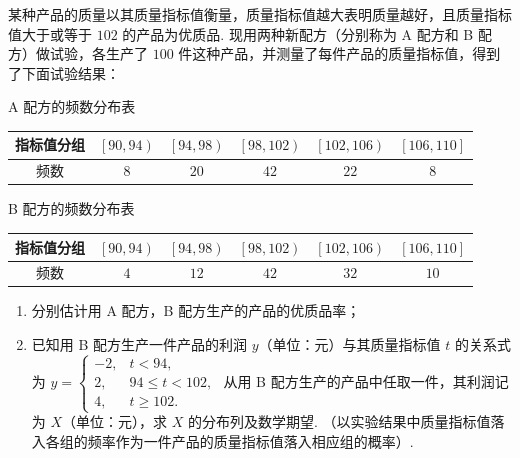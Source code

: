 \begin{problem}
某种产品的质量以其质量指标值衡量，质量指标值越大表明质量越好，且质量指标值大于或等于 \(102\) 的产品为优质品. 现用两种新配方（分别称为 A 配方和 B 配方）做试验，各生产了 \(100\) 件这种产品，并测量了每件产品的质量指标值，得到了下面试验结果：

\begin{center}
A 配方的频数分布表

\begin{tabular}{c|c|c|c|c|c}
\hline
指标值分组 & \(\left[90,94\right)\) & \(\left[94,98\right)\) & \(\left[98,102\right)\) & \(\left[102,106\right)\) & \(\left[106,110\right]\) \\
\hline
频数 & \(8\) & \(20\) & \(42\) & \(22\) & \(8\) \\
\hline
\end{tabular}

B 配方的频数分布表

\begin{tabular}{c|c|c|c|c|c}
\hline
指标值分组 & \(\left[90,94\right)\) & \(\left[94,98\right)\) & \(\left[98,102\right)\) & \(\left[102,106\right)\) & \(\left[106,110\right]\) \\
\hline
频数 & \(4\) & \(12\) & \(42\) & \(32\) & \(10\) \\
\hline
\end{tabular}
\end{center}

\begin{enumerate}
\item 分别估计用 A 配方，B 配方生产的产品的优质品率；
\item 已知用 B 配方生产一件产品的利润 \(y\)（单位：元）与其质量指标值 \(t\) 的关系式为 \( y = \begin{cases}
-2, & t < 94,\\
2, & 94 \leqslant t < 102,\\
4, & t \geqslant 102.
\end{cases} \) 从用 B 配方生产的产品中任取一件，其利润记为 \(X\)（单位：元），求 \(X\) 的分布列及数学期望. （以实验结果中质量指标值落入各组的频率作为一件产品的质量指标值落入相应组的概率）.
\end{enumerate}
\end{problem}

